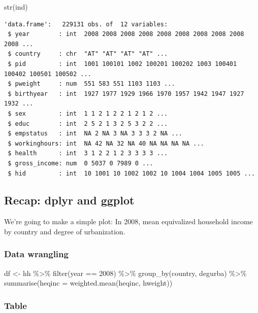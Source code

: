 \documentclass[
  letterpaper,
  DIV=11,
  numbers=noendperiod]{scrartcl}
\newenvironment{Shaded}{\begin{snugshade}}{\end{snugshade}}
\newcommand{\AttributeTok}[1]{\textcolor[rgb]{0.40,0.45,0.13}{#1}}
\newcommand{\DecValTok}[1]{\textcolor[rgb]{0.68,0.00,0.00}{#1}}
\newcommand{\FunctionTok}[1]{\textcolor[rgb]{0.28,0.35,0.67}{#1}}
\newcommand{\NormalTok}[1]{\textcolor[rgb]{0.00,0.23,0.31}{#1}}
\newcommand{\OtherTok}[1]{\textcolor[rgb]{0.00,0.23,0.31}{#1}}
\newcommand{\SpecialCharTok}[1]{\textcolor[rgb]{0.37,0.37,0.37}{#1}}
\begin{document}
\begin{Shaded}
\begin{Highlighting}[]
\FunctionTok{str}\NormalTok{(ind)}
\end{Highlighting}
\end{Shaded}

\begin{verbatim}
'data.frame':   229131 obs. of  12 variables:
 $ year        : int  2008 2008 2008 2008 2008 2008 2008 2008 2008 2008 ...
 $ country     : chr  "AT" "AT" "AT" "AT" ...
 $ pid         : int  1001 100101 1002 100201 100202 1003 100401 100402 100501 100502 ...
 $ pweight     : num  551 583 551 1103 1103 ...
 $ birthyear   : int  1927 1977 1929 1966 1970 1957 1942 1947 1927 1932 ...
 $ sex         : int  1 1 2 1 2 2 1 2 1 2 ...
 $ educ        : int  2 5 2 1 3 2 5 3 2 2 ...
 $ empstatus   : int  NA 2 NA 3 NA 3 3 3 2 NA ...
 $ workinghours: int  NA 42 NA 32 NA 40 NA NA NA NA ...
 $ health      : int  3 1 2 2 1 2 3 3 3 3 ...
 $ gross_income: num  0 5037 0 7989 0 ...
 $ hid         : int  10 1001 10 1002 1002 10 1004 1004 1005 1005 ...
\end{verbatim}

\subsection{Recap: dplyr and ggplot}\label{recap-dplyr-and-ggplot}

We're going to make a simple plot: In 2008, mean equivalized household
income by country and degree of urbanization.

\subsubsection{Data wrangling}\label{data-wrangling}

\begin{Shaded}
\begin{Highlighting}[]
\NormalTok{df }\OtherTok{\textless{}{-}}\NormalTok{ hh }\SpecialCharTok{\%\textgreater{}\%} 
  \FunctionTok{filter}\NormalTok{(year }\SpecialCharTok{==} \DecValTok{2008}\NormalTok{) }\SpecialCharTok{\%\textgreater{}\%} 
  \FunctionTok{group\_by}\NormalTok{(country, degurba) }\SpecialCharTok{\%\textgreater{}\%} 
  \FunctionTok{summarise}\NormalTok{(}\AttributeTok{heqinc =} \FunctionTok{weighted.mean}\NormalTok{(heqinc, hweight))}
\end{Highlighting}
\end{Shaded}

\subsubsection{Table}\label{table}
\end{document}

